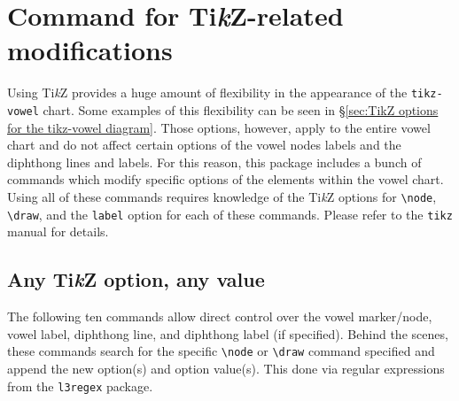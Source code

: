 \documentclass{article}
\newcommand{\pkg}[1]{\texttt{#1}}
\newcommand{\TikZ}{Ti\textit{k}Z\xspace}
\begin{document}
\section{Command for \TikZ-related modifications}
\label{sec:Command for TikZ-related modifications}

Using \TikZ provides a huge amount of flexibility in the appearance of the \texttt{tikz-vowel} chart.  Some examples of this flexibility can be seen in \S \ref{sec:TikZ options for the tikz-vowel diagram}.  Those options, however, apply to the entire vowel chart and do not affect certain options of the vowel nodes labels and the diphthong lines and labels.  For this reason, this package includes a bunch of commands which modify specific options of the elements within the vowel chart.  Using all of these commands requires knowledge of the \TikZ options for \verb|\node|, \verb|\draw|, and the \texttt{label} option for each of these commands.  Please refer to the \pkg{tikz} manual for details.

\subsection{Any \TikZ option, any value}
\label{sec:Any TikZ option, any value}

The following ten commands allow direct control over the vowel marker/node, vowel label, diphthong line, and diphthong label (if specified).  Behind the scenes, these commands search for the specific \verb|\node| or \verb|\draw| command specified and append the new option(s) and option value(s).  This done via regular expressions from the \pkg{l3regex} package.
\end{document}
